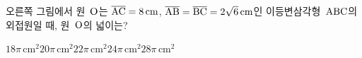 \noindent\begin{minipage}[t]{0.58\linewidth}\vspace{0pt}\raggedright 오른쪽 그림에서 원~$\mathrm{O}$는 $\overline{\mathrm{AC}}=8\,\mathrm{cm}$, $\overline{\mathrm{AB}}=\overline{\mathrm{BC}}=2\sqrt{6}\,\mathrm{cm}$인 이등변삼각형~$\mathrm{ABC}$의 외접원일 때, 원~$\mathrm{O}$의 넓이는?\end{minipage}\hfill\begin{minipage}[t]{0.4\linewidth}\vspace{0pt}\centering \resizebox{\ifdim\width>\linewidth\linewidth\else\width\fi}{!}{}\end{minipage}\par
\begin{choicesii}{$18\pi\,\mathrm{cm}^2$}{$20\pi\,\mathrm{cm}^2$}{$22\pi\,\mathrm{cm}^2$}{$24\pi\,\mathrm{cm}^2$}{$28\pi\,\mathrm{cm}^2$}\end{choicesii}
